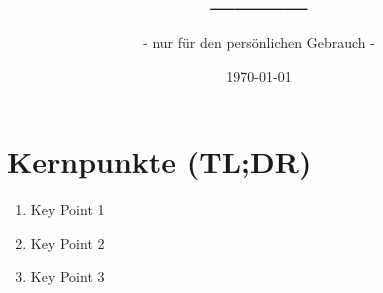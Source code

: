 \documentclass{article}
\title{____}
\subtitle{- nur für den persönlichen Gebrauch -}
\date{\today} %
\begin{document}
\maketitle %
\thispagestyle{fancy} %
\hypertarget{toc}{}


\tableofcontents %
\listoftables
\listoffigures
\hypersetup{
  linkcolor = red!70!black,
  citecolor = black, %
  urlcolor = blue    %
}





\section{Kernpunkte (TL;DR)} %
\begin{enumerate}
    \item Key Point 1
    \item Key Point 2
    \item Key Point 3
\end{enumerate}
\end{document}
